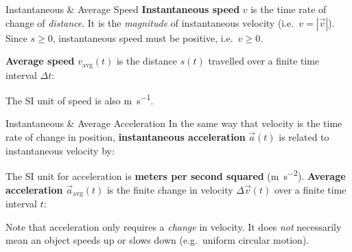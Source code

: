 \documentclass[12pt,compress,aspectratio=169,dvipsnames]{beamer}
\begin{document}
\begin{frame}{Instantaneous \& Average Speed}
  \textbf{Instantaneous speed} $v$ is the time rate of change of
  \emph{distance}. It is the \emph{magnitude} of instantaneous velocity
  (i.e.\ $v=|\vec v|$). Since $s\geq 0$, instantaneous speed must be positive,
  i.e.\ $v\geq 0$.


  \textbf{Average speed} $v_\text{avg}(t)$ is the distance $s(t)$ travelled
  over a finite time interval $\Delta t$:
  

  The SI unit of speed is also \si{\metre\per\second}.
\end{frame}





\begin{frame}{Instantaneous \& Average Acceleration}
  In the same way that velocity is the time rate of change in position,
  \textbf{instantaneous acceleration} $\vec a(t)$ is related to
  instantaneous velocity by:


  The SI unit for acceleration is \textbf{meters per second squared}
  (\si{\metre\per\second\squared}). \textbf{Average acceleration}
  $\vec a_\text{avg}(t)$ is the finite change in velocity $\Delta\vec v(t)$ over
  a finite time interval $t$:


  Note that acceleration only requires a \emph{change} in velocity. It does
  \emph{not} necessarily mean an object speeds up or slows down (e.g.\ uniform
  circular motion).
\end{frame}
\end{document}

